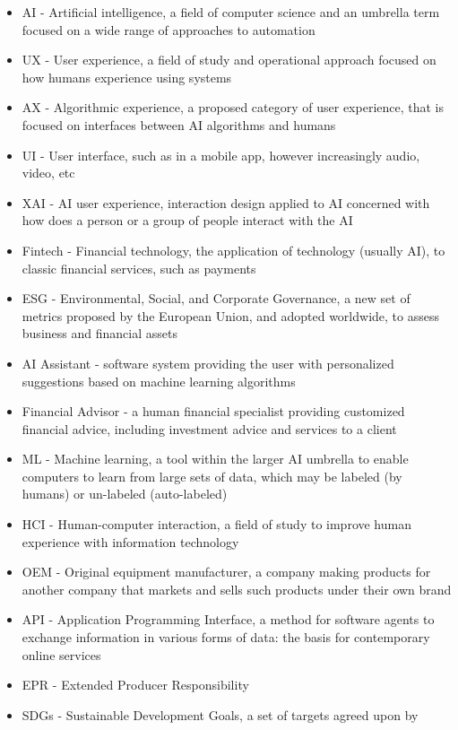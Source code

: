 \documentclass[
  letterpaper,
  DIV=11,
  numbers=noendperiod]{scrartcl}
\begin{document}
\begin{itemize}
\item
  AI - Artificial intelligence, a field of computer science and an
  umbrella term focused on a wide range of approaches to automation
\item
  UX - User experience, a field of study and operational approach
  focused on how humans experience using systems
\item
  AX - Algorithmic experience, a proposed category of user experience,
  that is focused on interfaces between AI algorithms and humans
\item
  UI - User interface, such as in a mobile app, however increasingly
  audio, video, etc
\item
  XAI - AI user experience, interaction design applied to AI concerned
  with how does a person or a group of people interact with the AI
\item
  Fintech - Financial technology, the application of technology (usually
  AI), to classic financial services, such as payments
\item
  ESG - Environmental, Social, and Corporate Governance, a new set of
  metrics proposed by the European Union, and adopted worldwide, to
  assess business and financial assets
\item
  AI Assistant - software system providing the user with personalized
  suggestions based on machine learning algorithms
\item
  Financial Advisor - a human financial specialist providing customized
  financial advice, including investment advice and services to a client
\item
  ML - Machine learning, a tool within the larger AI umbrella to enable
  computers to learn from large sets of data, which may be labeled (by
  humans) or un-labeled (auto-labeled)
\item
  HCI - Human-computer interaction, a field of study to improve human
  experience with information technology
\item
  OEM - Original equipment manufacturer, a company making products for
  another company that markets and sells such products under their own
  brand
\item
  API - Application Programming Interface, a method for software agents
  to exchange information in various forms of data: the basis for
  contemporary online services
\item
  EPR - Extended Producer Responsibility
\item
  SDGs - Sustainable Development Goals, a set of targets agreed upon by

\end{itemize}
\end{document}
